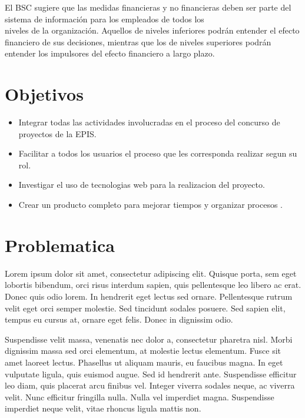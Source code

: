 \documentclass[%
 reprint,
 amsmath,amssymb,
 aps,
]{revtex4-1}
\begin{document}
El BSC sugiere que las medidas financieras y no financieras deben ser parte del sistema de información para los empleados de todos los\\
niveles de la organización. Aquellos de niveles inferiores podrán entender el efecto financiero de sus decisiones, mientras que los de niveles superiores podrán\\
entender los impulsores del efecto financiero a largo plazo.\\


\section {Objetivos}
\begin{itemize}
\item Integrar todas las actividades involucradas en el proceso del concurso de proyectos de la EPIS. \\
\item Facilitar a todos los usuarios el proceso que les corresponda realizar segun su rol. \\
\item Investigar el uso de tecnologias web para la realizacion del proyecto.  \\
\item Crear un producto completo para mejorar tiempos y organizar procesos .\\
\end{itemize}

\section {Problematica}
Lorem ipsum dolor sit amet, consectetur adipiscing elit. Quisque porta, sem eget lobortis bibendum, orci risus interdum sapien, quis pellentesque leo libero ac erat. Donec quis odio lorem. In hendrerit eget lectus sed ornare. Pellentesque rutrum velit eget orci semper molestie. Sed tincidunt sodales posuere. Sed sapien elit, tempus eu cursus at, ornare eget felis. Donec in dignissim odio.

Suspendisse velit massa, venenatis nec dolor a, consectetur pharetra nisl. Morbi dignissim massa sed orci elementum, at molestie lectus elementum. Fusce sit amet laoreet lectus. Phasellus ut aliquam mauris, eu faucibus magna. In eget vulputate ligula, quis euismod augue. Sed id hendrerit ante. Suspendisse efficitur leo diam, quis placerat arcu finibus vel. Integer viverra sodales neque, ac viverra velit. Nunc efficitur fringilla nulla. Nulla vel imperdiet magna. Suspendisse imperdiet neque velit, vitae rhoncus ligula mattis non.
\end{document}
